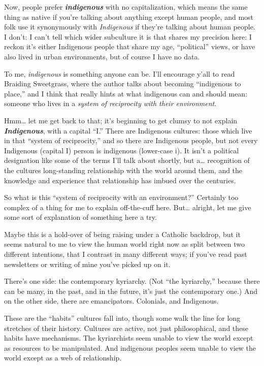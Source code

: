 \documentclass[11pt]{article}
\begin{document}
\begin{itemize}
Now, people prefer \textbf{\emph{indigenous}} with no capitalization, which means the same thing as native if you’re talking about anything except human people, and most folk use it synonymously with \emph{Indigenous} if they’re talking about human people. I don’t: I can’t tell which wider subculture it is that shares my precision here: I reckon it’s either Indigenous people that share my age, “political” views, or have also lived in urban environments, but of course I have no data.

To me, \emph{indigenous} is something anyone can be. I’ll encourage y’all to read Braiding Sweetgrass, where the author talks about becoming “indigenous to place,” and I think that really hints at what indigenous can and should mean: someone who lives in a \emph{system of reciprocity with their environment}.

Hmm… let me get back to that; it’s beginning to get clumsy to not explain \textbf{\emph{Indigenous}}, with a capital “I.” There are Indigenous cultures: those which live in that “system of reciprocity,” and so there are Indigenous people, but not every Indigenous (capital I) person is indigenous (lower-case i). It isn’t a political designation like some of the terms I’ll talk about shortly, but a… recognition of the cultures long-standing relationship with the world around them, and the knowledge and experience that relationship has imbued over the centuries.

So what is this “system of reciprocity with an environment?” Certainly too complex of a thing for me to explain off-the-cuff here. But… alright, let me give some sort of explanation of something here a try.

Maybe this is a hold-over of being raising under a Catholic backdrop, but it seems natural to me to view the human world right now as split between two different intentions, that I contrast in many different ways; if you’ve read past newsletters or writing of mine you’ve picked up on it.

There’s one side: the contemporary kyriarchy. (Not “the kyriarchy,” because there can be many, in the past, and in the future, it’s just the contemporary one.) And on the other side, there are emancipators. Colonials, and Indigenous.

These are the “habits” cultures fall into, though some walk the line for long stretches of their history. Cultures are active, not just philosophical, and these habits have mechanisms. The kyriarchists seem unable to view the world except as resources to be manipulated. And indigenous peoples seem unable to view the world except as a web of relationship.


\end{itemize}
\end{document}
